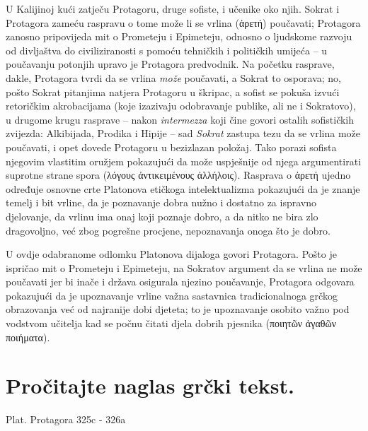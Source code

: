 U Kalijinoj kući zatječu Protagoru, druge sofiste, i učenike oko njih. Sokrat i Protagora zameću raspravu o tome može li se vrlina (\textgreek[variant=ancient]{ἀρετή}) poučavati; Protagora zanosno pripovijeda mit o Prometeju i Epimeteju, odnosno o ljudskome razvoju od divljaštva do civiliziranosti s pomoću tehničkih i političkih umijeća – u poučavanju potonjih upravo je Protagora predvodnik. Na početku rasprave, dakle, Protagora tvrdi da se vrlina \textit{može} poučavati, a Sokrat to osporava; no, pošto Sokrat pitanjima natjera Protagoru u škripac, a sofist se pokuša izvući retoričkim akrobacijama (koje izazivaju odobravanje publike, ali ne i Sokratovo), u drugome krugu rasprave -- nakon \textit{intermezza} koji čine govori ostalih sofističkih zvijezda: Alkibijada, Prodika i Hipije – sad \textit{Sokrat} zastupa tezu da se vrlina može poučavati, i opet dovede Protagoru u bezizlazan položaj. Tako porazi sofista njegovim vlastitim oružjem pokazujući da može uspješnije od njega argumentirati suprotne strane spora (\textgreek[variant=ancient]{λόγους ἀντικειμένους ἀλλήλοις}). Rasprava o \textgreek[variant=ancient]{ἀρετή} ujedno određuje osnovne crte Platonova etičkoga intelektualizma pokazujući da je znanje temelj i bit vrline, da je poznavanje dobra nužno i dostatno za ispravno djelovanje, da vrlinu ima onaj koji poznaje dobro, a da nitko ne bira zlo dragovoljno, već zbog pogrešne procjene, nepoznavanja onoga što je dobro.

U ovdje odabranome odlomku Platonova dijaloga govori Protagora. Pošto je ispričao mit o Prometeju i Epimeteju, na Sokratov argument da se vrlina ne može poučavati jer bi inače i država osigurala njezino poučavanje, Protagora odgovara pokazujući da je upoznavanje vrline važna sastavnica tradicionalnoga grčkog obrazovanja već od najranije dobi djeteta; to je upoznavanje osobito važno pod vodstvom učitelja kad se počnu čitati djela dobrih pjesnika (\textgreek[variant=ancient]{ποιητῶν ἀγαθῶν ποιήματα}).


\section*{Pročitajte naglas grčki tekst.}

Plat. Protagora 325c - 326a


\medskip


